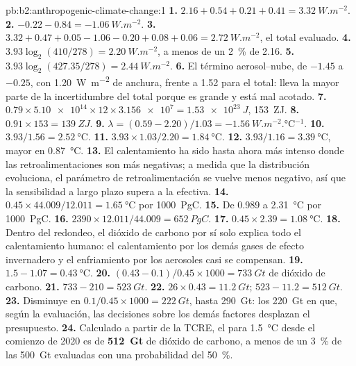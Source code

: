 \begin{solution}{pb:b2:anthropogenic-climate-change:1}
\textbf{1.} $2.16 + 0.54 + 0.21 + 0.41 = \qty{3.32}{W.m^{-2}}$.
\textbf{2.} $-0.22 - 0.84 = \qty{-1.06}{W.m^{-2}}$.
\textbf{3.} $3.32 + 0.47 + 0.05 - 1.06 - 0.20 + 0.08 + 0.06 = \qty{2.72}{W.m^{-2}}$, el total
evaluado.
\textbf{4.} $3.93\log_2(410/278) = \qty{2.20}{W.m^{-2}}$, a menos de un \qty{2}{\percent} de 2.16.
\textbf{5.} $3.93\log_2(427.35/278) = \qty{2.44}{W.m^{-2}}$.
\textbf{6.} El término aerosol--nube, de $-1.45$ a $-0.25$, con \qty{1.20}{W.m^{-2}} de anchura, frente a 1.52 para
el total: lleva la mayor parte de la incertidumbre del total porque es grande y está mal
acotado.
\textbf{7.} $0.79 \times \num{5.10e14} \times 12 \times \num{3.156e7} = \qty{1.53e23}{J}$,
\qty{153}{ZJ}.
\textbf{8.} $0.91 \times 153 = \qty{139}{ZJ}$.
\textbf{9.} $\lambda = (0.59 - 2.20)/1.03 = \qty{-1.56}{W.m^{-2}.\celsius^{-1}}$.
\textbf{10.} $3.93/1.56 = \qty{2.52}{\celsius}$.
\textbf{11.} $3.93 \times 1.03/2.20 = \qty{1.84}{\celsius}$.
\textbf{12.} $3.93/1.16 = \qty{3.39}{\celsius}$, mayor en \qty{0.87}{\celsius}.
\textbf{13.} El calentamiento ha sido hasta ahora más intenso donde las retroalimentaciones son más negativas; a medida que la
distribución evoluciona, el parámetro de retroalimentación se vuelve menos negativo, así que la sensibilidad a largo plazo
supera a la efectiva.
\textbf{14.} $0.45 \times 44.009/12.011 = \qty{1.65}{\celsius}$ por \qty{1000}{PgC}.
\textbf{15.} De 0.989 a \qty{2.31}{\celsius} por \qty{1000}{PgC}.
\textbf{16.} $2390 \times 12.011/44.009 = \qty{652}{PgC}$.
\textbf{17.} $0.45 \times 2.39 = \qty{1.08}{\celsius}$.
\textbf{18.} Dentro del redondeo, el dióxido de carbono por sí solo explica todo el calentamiento humano: el
calentamiento por los demás gases de efecto invernadero y el enfriamiento por los aerosoles casi se compensan.
\textbf{19.} $1.5 - 1.07 = \qty{0.43}{\celsius}$.
\textbf{20.} $(0.43 - 0.1)/0.45 \times 1000 = \qty{733}{Gt}$ de dióxido de carbono.
\textbf{21.} $733 - 210 = \qty{523}{Gt}$.
\textbf{22.} $26 \times 0.43 = \qty{11.2}{Gt}$; $523 - 11.2 = \qty{512}{Gt}$.
\textbf{23.} Disminuye en $0.1/0.45 \times 1000 = \qty{222}{Gt}$, hasta \qty{290}{Gt}: los
\qty{220}{Gt} en que, según la evaluación, las decisiones sobre los demás factores desplazan el presupuesto.
\textbf{24.} Calculado a partir de la TCRE, el  para \qty{1.5}{\celsius} desde el
comienzo de 2020 es de \textbf{\qty[text-series-to-math=true]{512}{Gt}} de dióxido de carbono, a menos de un
\qty{3}{\percent} de las \qty{500}{Gt} evaluadas con una probabilidad del \qty{50}{\percent}.
\end{solution}
